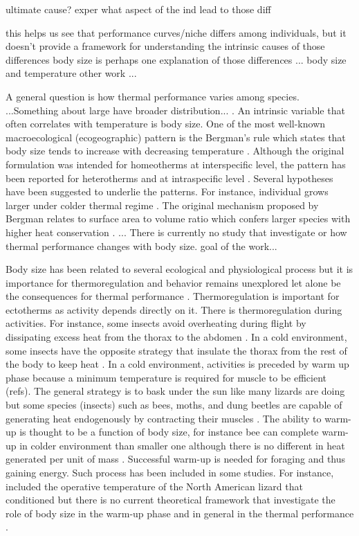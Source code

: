ultimate cause? exper what aspect of the ind lead to those diff


this helps us see that performance curves/niche differs among individuals, but it doesn't provide a framework for understanding the intrinsic causes of those differences
body size is perhaps one explanation of those differences ... body size and temperature other work ...


A general question is how thermal performance varies among species.
...Something about large have broader distribution... \citep{Lumaret1996}.
An intrinsic variable that often correlates with temperature is body size.
One of the most well-known macroecological (ecogeographic) pattern is the Bergman's rule which states that body size tends to increase with decreasing temperature \citep{Bergman1847}. 
Although the original formulation was intended for homeotherms at interspecific level, the pattern has been reported for heterotherms and at intraspecific level \citep{Blackburn1999}.
Several hypotheses have been suggested to underlie the patterns.
For instance, individual grows larger under colder thermal regime \citep{Van1996}.
The original mechanism proposed by Bergman relates to surface area to volume ratio which confers larger species with higher heat conservation \citep{Blackburn1999}.
...
There is currently no study that investigate or how thermal performance changes with body size.
goal of the work...

Body size has been related to several ecological and physiological process but it is importance for thermoregulation and behavior remains unexplored let alone be the consequences for thermal performance \citep{Dial2008}.
Thermoregulation  is important for ectotherms as activity depends directly on it.
There is thermoregulation during activities.
For instance, some insects avoid overheating during flight by dissipating excess heat from the thorax to the abdomen \citep{Verdu2012}.
In a cold environment, some insects have the opposite strategy that insulate the thorax from the rest of the body to keep heat \citep{Verdu2012}.
In a cold environment, activities is  preceded by warm up phase because a minimum temperature is required for muscle to be efficient (refs).
The general strategy is to bask under the sun like many lizards are doing but some species (insects) such as bees, moths, and dung beetles are capable of generating heat endogenously by contracting their muscles \citep{Heinrich1975, Bartholomew1978, Bartholomew1981}.
The ability to warm-up is thought to be a function of body size, for instance  bee can complete warm-up in colder environment than smaller one although there is no different in heat generated per unit of mass \citep{Kammer1974, Heinrich1975}.
Successful warm-up is needed for foraging and thus gaining energy.
Such process has been included in some studies.
For instance, \citet{Buckley2008} included the operative temperature of the North American lizard that conditioned but there is no current theoretical framework that investigate the role of body size in the warm-up phase and in general in the thermal performance \citep{Dial2008}.

